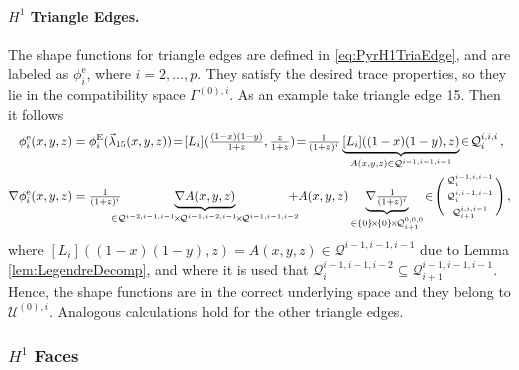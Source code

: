 \paragraph{\texorpdfstring{$H^1$}{H1} Triangle Edges.}
The shape functions for triangle edges are defined in \eqref{eq:PyrH1TriaEdge}, and are labeled as $\phi_i^\mathrm{e}$, where $i=2,\ldots,p$.
They satisfy the desired trace properties, so they lie in the compatibility space $\Gamma^{(0),i}$.
As an example take triangle edge 15.
Then it follows
\begin{equation}
\begin{aligned}
	\phi_i^\mathrm{e}(x,y,z)&=\phi_i^\E(\vec{\lambda}_{15}(x,y,z))
		\!=\![L_i](\textstyle{\frac{(1-x)(1-y)}{1+z}},\textstyle{\frac{z}{1+z}})
			\!=\!\textstyle{\frac{1}{(1+z)^i}}
				\underbrace{[L_i]((1-x)(1-y),z)}_{A(x,y,z)\in\mathcal{Q}^{i-1,i-1,i-1}}\!\in\!\mathcal{Q}_i^{i,i,i}\,,\\
	\nabla\phi_i^\mathrm{e}(x,y,z)&=\textstyle{\frac{1}{(1+z)^i}}\!\!\!\!\!\!
		\underbrace{\nabla A(x,y,z)}_{\in\mathcal{Q}^{i-2,i-1,i-1}\!\times\!\mathcal{Q}^{i-1,i-2,i-1}
			\!\times\!\mathcal{Q}^{i-1,i-1,i-2}}\!\!\!\!\!\!
				+A(x,y,z)\underbrace{\nabla\textstyle{\frac{1}{(1+z)^i}}}_{\in\{0\}\!\times\!\{0\}\!\times\!\mathcal{Q}_{i+1}^{0,0,0}}
			\!\in\!\Bigg(\begin{smallmatrix}\mathcal{Q}_i^{i-1,i,i-1}\\[2pt]\mathcal{Q}_i^{i,i-1,i-1}\\[2pt]
				\mathcal{Q}_{i+1}^{i,i,i-1}\end{smallmatrix}\Bigg)\,,
\end{aligned}
\end{equation}
where $[L_i]((1-x)(1-y),z)=A(x,y,z)\in\mathcal{Q}^{i-1,i-1,i-1}$ due to Lemma \ref{lem:LegendreDecomp}, and where it is used that $\mathcal{Q}_i^{i-1,i-1,i-2}\subseteq\mathcal{Q}_{i+1}^{i-1,i-1,i-1}$.
Hence, the shape functions are in the correct underlying space and they belong to $\mathcal{U}^{(0),i}$.
Analogous calculations hold for the other triangle edges.

\subsubsection {\texorpdfstring{$H^1$}{H1} Faces}

